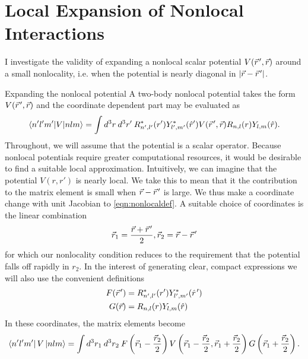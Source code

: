 

\chapter{\label{chap:localExpansion}Local Expansion of Nonlocal Interactions}


I investigate the validity of expanding a nonlocal scalar potential $V(\vec{r}\mkern2mu',\vec{r})$ around a small nonlocality, i.e. when the potential is nearly diagonal in $|\vec{r}-\vec{r}\mkern2mu'|$. 


\begin{section}{Expanding the nonlocal potential}
A two-body nonlocal potential takes the form $V(\vec{r}\mkern2mu',\vec{r})$ and the coordinate dependent part may be evaluated as
\begin{equation}\label{eqn:nonlocaldef}
\braket{n' l' m'| V | n l m}=\int d^3r\:d^3r'\:R^*_{n',l'}(r') Y^*_{l',m'}(\hat{r}') V(\vec{r}\mkern2mu',\vec{r}) R_{n,l}(r) Y_{l,m}(\hat{r}).
\end{equation}
Throughout, we will assume that the potential is a scalar operator. Because nonlocal potentials require greater computational resources, it would be desirable to find a suitable local approximation. Intuitively, we can imagine that the potential $V(r,r')$ is nearly local. We take this to mean that it the contribution to the matrix element is small when $\vec{r}-\vec{r}\mkern2mu'$ is large. We thus make a coordinate change with unit Jacobian to \eqref{eqn:nonlocaldef}. A suitable choice of coordinates is the linear combination
\begin{equation}\label{eqn:coords}
\vec{r}_1=\frac{\vec{r}+\vec{r}\mkern2mu'}{2},\vec{r}_2=\vec{r}-\vec{r}\mkern2mu'
\end{equation}
for which our nonlocality condition reduces to the requirement that the potential falls off rapidly in $r_2$. In the interest of generating clear, compact expressions we will also use the convenient definitions
\begin{align}
F(\vec{r}\mkern2mu')&=R^*_{n',l'}(r') Y^*_{l',m'}(\hat{r}\mkern2mu')\\
G(\vec{r})&=R_{n,l}(r) Y_{l,m}(\hat{r})
\end{align}
In these coordinates, the matrix elements become 
\begin{equation}
\bra{n' l' m'} V \ket{ n l m}= \int d^3r_1\:d^3r_2\:F\left( \vec{r}_1-\frac{\vec{r}_2}{2} \right) V\left(\vec{r}_1-\frac{\vec{r}_2}{2},\vec{r}_1+\frac{\vec{r}_2}{2}\right) 
G\left( \vec{r}_1+\frac{\vec{r}_2}{2}\right).
\end{equation}

\end{section}

